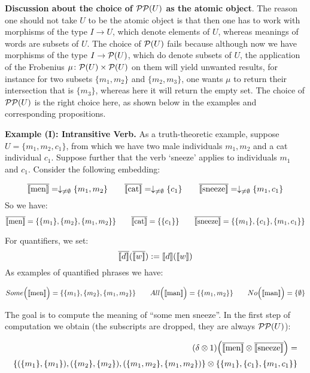 \bigskip
\noindent
{\bf Discussion about the choice of ${\cal P}{\cal P}(U)$ as the atomic object}. The reason one should not take $U$ to be the atomic object is that then one has to work with morphisms of the type $I \to U$, which denote elements of $U$, whereas meanings of words are subsets of $U$. The choice of ${\cal P}(U)$ fails because although now we have morphisms of the type $I \to {\cal P}(U)$, which do denote subsets of $U$, the application of the Frobenius $\mu \colon {\cal P}(U) \times {\cal P}(U)$ on them will yield unwanted results, for instance for two subsets $\{m_1, m_2\}$ and $\{m_2, m_3\}$, one wants $\mu$ to return their intersection that is $\{m_3\}$, whereas here it will return the empty set. The choice of ${\cal P}{\cal P}(U)$ is the right choice here, as shown below in the examples and corresponding propositions.   



\bigskip
\bigskip
\noindent
{\bf Example (I): Intransitive Verb.} As a truth-theoretic  example,  suppose $U = \{m_1, m_2, c_1\}$, from which we have two male individuals $m_1, m_2$  and a cat   individual $c_1$.  Suppose further that  the verb `sneeze'  applies to individuals $m_1$ and $c_1$. Consider the following embedding:

\[
\overline{[\![ \text{men} ]\!]} =  \downarrow_{\neq \emptyset}\{m_1, m_2\}  \qquad
\overline{[\![ \text{cat} ]\!]} =  \downarrow_{\neq \emptyset}\{c_1\}  \qquad
\overline{[\![ \text{sneeze} ]\!]} = \downarrow_{\neq \emptyset}\{m_1, c_1\}
\]
So we have:
\[
\overline{[\![ \text{men} ]\!]} =  \{\{m_1\}, \{m_2\}, \{m_1, m_2\}\}  \qquad
\overline{[\![ \text{cat} ]\!]} =  \{\{c_1\}\}  \qquad
\overline{[\![ \text{sneeze} ]\!]} = \{\{m_1\}, \{c_1\}, \{m_1, c_1\}\}
\]

\noindent
For  quantifiers, we set:
\[
\overline{\semantics{d}}  (\overline{\semantics{w}})  :=  \semantics{d}(\semantics{w}) 
\]
As examples of quantified phrases we have:

\[
Some\Big({[\![ \text{men} ]\!]}\Big) =  \{\{m_1\}, \{m_2\}, \{m_1, m_2\}\} \qquad
All\Big({[\![ \text{man} ]\!]}\Big) = \{\{m_1, m_2\}\} \qquad 
No\Big({[\![ \text{man} ]\!]}\Big) = \{\emptyset\} 
\]

\noindent
The goal is to compute the meaning of  ``some men sneeze''. In the first step of computation we obtain (the subscripts are dropped,  they are always ${\cal P}{\cal P}(U)$):

\begin{align*}
(\delta \otimes 1)\Big(\overline{[\![ \text{men} ]\!]} \otimes \overline{[\![ \text{sneeze} ]\!]}\Big) =&\\
  \{(\{m_1\}, \{m_1\}), (\{m_2\}, \{m_2\}), (\{m_1, m_2\}, \{m_1, m_2\}) \} \otimes  \{\{m_1\}, \{c_1\}, \{m_1, c_1\}\} 
\end{align*}

